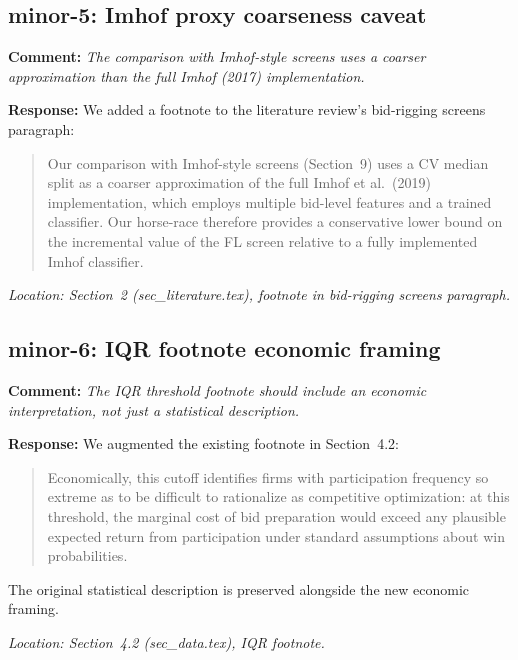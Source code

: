 \documentclass[12pt]{article}
\newcommand{\referee}[1]{\medskip\noindent\textbf{Comment:} \textit{#1}\medskip}
\newcommand{\response}[1]{\noindent\textbf{Response:} #1}
\begin{document}
\subsection*{minor-5: Imhof proxy coarseness caveat}

\referee{The comparison with Imhof-style screens uses a coarser
approximation than the full Imhof (2017) implementation.}

\response{We added a footnote to the literature review's bid-rigging
screens paragraph:}

\begin{quote}
Our comparison with Imhof-style screens (Section~9) uses a CV median
split as a coarser approximation of the full Imhof et al.\ (2019)
implementation, which employs multiple bid-level features and a trained
classifier. Our horse-race therefore provides a conservative lower bound
on the incremental value of the FL screen relative to a fully implemented
Imhof classifier.
\end{quote}

\noindent\textit{Location: Section~2 (sec\_literature.tex), footnote in
bid-rigging screens paragraph.}

\subsection*{minor-6: IQR footnote economic framing}

\referee{The IQR threshold footnote should include an economic
interpretation, not just a statistical description.}

\response{We augmented the existing footnote in Section~4.2:}

\begin{quote}
Economically, this cutoff identifies firms with participation frequency
so extreme as to be difficult to rationalize as competitive optimization:
at this threshold, the marginal cost of bid preparation would exceed any
plausible expected return from participation under standard assumptions
about win probabilities.
\end{quote}

\noindent The original statistical description is preserved alongside
the new economic framing.

\noindent\textit{Location: Section~4.2 (sec\_data.tex), IQR footnote.}

\end{document}
